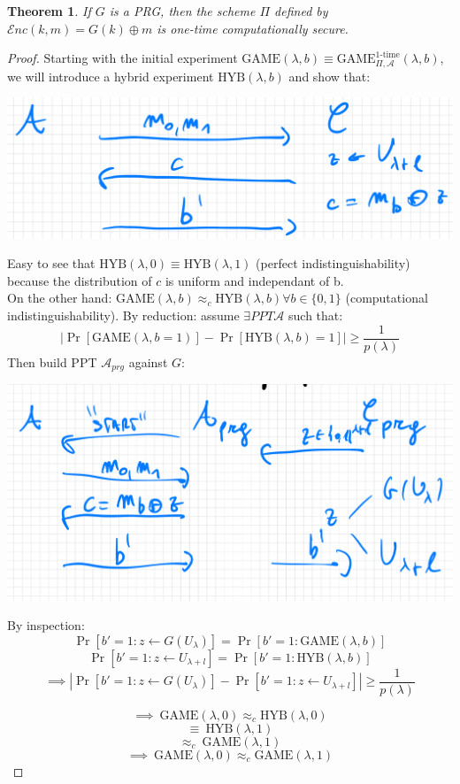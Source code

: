 \documentclass[11pt, a4paper]{article}
\newcommand{\enc}{\mathcal{E}nc}
\newcommand{\game}{\text{GAME}}
\newtheorem{thm}{Theorem}
\begin{document}
\begin{thm}
    If $G$ is a PRG, then the scheme $\Pi$ defined by $\enc(k,m) = G(k) \oplus m$ is one-time computationally secure.
\end{thm}
\begin{proof}
    Starting with the initial experiment $\game(\lambda,b) \equiv \game_{\Pi, \mathcal{A}}^{1\text{-time}}(\lambda, b)$, we will introduce a hybrid experiment $\text{HYB}(\lambda, b)$ and show that:
    \begin{center}
        \includegraphics[scale=0.5]{img/Comp_sec/HYb.png}
    \end{center}
    Easy to see that $\text{HYB}(\lambda, 0) \equiv \text{HYB}(\lambda, 1)$ (perfect indistinguishability) because the distribution of $c$ is uniform and independant of b.\\
    On the other hand: $\game(\lambda, b) \approx_c \text{HYB}(\lambda, b) \forall b \in \{0,1\}$ (computational indistinguishability). By reduction: assume $\exists PPT \mathcal{A}$ such that:\\
    $$|\Pr[\game(\lambda,b = 1)] - \Pr[\text{HYB}(\lambda,b)= 1]| \geq \frac{1}{p(\lambda)}$$
    Then build PPT $\mathcal{A}_{prg}$ against $G$:
    \begin{center}
        \includegraphics[scale=0.4]{img/Comp_sec/red2.png}
    \end{center}
    By inspection:\\
    \[
\Pr\left[ b' = 1 : z \leftarrow G(U_\lambda) \right] = \Pr\left[ b' = 1 : \game(\lambda, b) \right]
\]
\[
\Pr\left[ b' = 1 : z \leftarrow U_{\lambda + l} \right] = \Pr\left[ b' = 1 : \text{HYB}(\lambda, b) \right]
\]
\[
\implies \left| \Pr\left[ b' = 1 : z \leftarrow G(U_\lambda) \right] - \Pr\left[ b' = 1 : z \leftarrow U_{\lambda + l} \right] \right| \geq \frac{1}{p(\lambda)}
\]

\[
\implies\ \game(\lambda, 0) \approx_c \text{HYB}(\lambda, 0)
\]
\[
\equiv\ \text{HYB}(\lambda, 1)
\]
\[
\approx_c\ \game(\lambda, 1)
\]
\[
\implies\ \game(\lambda, 0) \approx_c \game(\lambda, 1)
\]
\end{proof}
\end{document}
